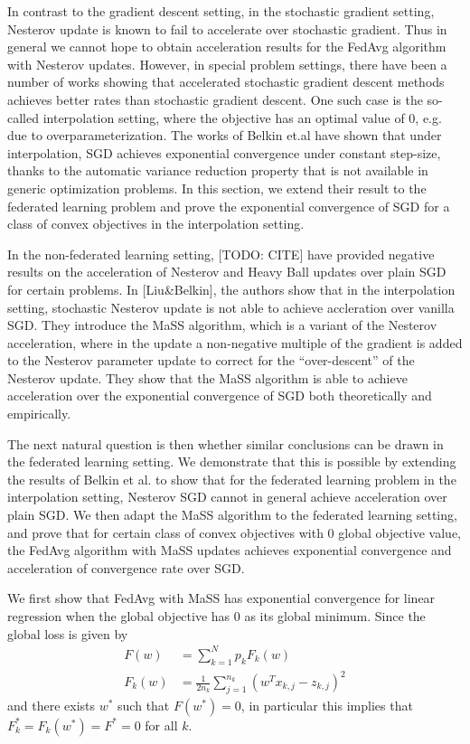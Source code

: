 In contrast to the gradient descent setting, in the stochastic gradient
setting, Nesterov update is known to fail to accelerate over stochastic
gradient. Thus in general we cannot hope to obtain acceleration results
for the FedAvg algorithm with Nesterov updates. However, in special
problem settings, there have been a number of works showing that accelerated
stochastic gradient descent methods achieves better rates than stochastic
gradient descent. One such case is the so-called interpolation setting,
where the objective has an optimal value of 0, e.g. due to overparameterization.
The works of Belkin et.al have shown that under interpolation, SGD
achieves exponential convergence under constant step-size, thanks
to the automatic variance reduction property that is not available
in generic optimization problems. In this section, we extend their
result to the federated learning problem and prove the exponential
convergence of SGD for a class of convex objectives in the interpolation
setting.

In the non-federated learning setting, {[}TODO: CITE{]} have provided
negative results on the acceleration of Nesterov and Heavy Ball updates
over plain SGD for certain problems. In {[}Liu\&Belkin{]}, the authors
show that in the interpolation setting, stochastic Nesterov update
is not able to achieve accleration over vanilla SGD. They introduce
the MaSS algorithm, which is a variant of the Nesterov acceleration,
where in the update a non-negative multiple of the gradient is added
to the Nesterov parameter update to correct for the ``over-descent''
of the Nesterov update. They show that the MaSS algorithm is able
to achieve acceleration over the exponential convergence of SGD both
theoretically and empirically.

The next natural question is then whether similar conclusions can
be drawn in the federated learning setting. We demonstrate that this
is possible by extending the results of Belkin et al. to show that
for the federated learning problem in the interpolation setting, Nesterov
SGD cannot in general achieve acceleration over plain SGD. We then
adapt the MaSS algorithm to the federated learning setting, and prove
that for certain class of convex objectives with 0 global objective
value, the FedAvg algorithm with MaSS updates achieves exponential
convergence and acceleration of convergence rate over SGD. 

We first show that FedAvg with MaSS has exponential convergence for
linear regression when the global objective has 0 as its global minimum.
Since the global loss is given by 
\begin{align*}
F(w) & =\sum_{k=1}^{N}p_{k}F_{k}(w)\\
F_{k}(w) & =\frac{1}{2n_{k}}\sum_{j=1}^{n_{k}}(w^{T}x_{k,j}-z_{k,j})^{2}
\end{align*}
 and there exists $w^{\ast}$ such that $F(w^{\ast})=0$, in particular
this implies that $F_{k}^{\ast}=F_{k}(w^{\ast})=F^{\ast}=0$ for all
$k$.

